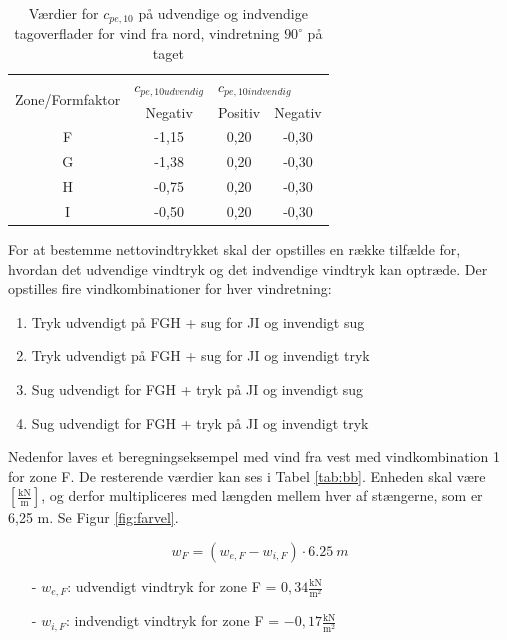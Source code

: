 \begin{table}[htb]
	\begin{center}
		\begin{tabular}{ c c c c } 
			\hline
			\multirow{2}{*}{Zone/Formfaktor} & $c_{pe,10 udvendig}$ & \multicolumn{2}{l}{$c_{pe,10 indvendig}$} \\	
			& Negativ & Positiv & Negativ \\ \hline
			F & -1,15 & 0,20 & -0,30 \\	
			G & -1,38 & 0,20 & -0,30 \\ 
			H & -0,75 & 0,20 & -0,30 \\ 
			I & -0,50 & 0,20 & -0,30 \\	
		\end{tabular}
		\caption{Værdier for $c_{pe,10}$ på udvendige og indvendige tagoverflader for vind fra nord, vindretning $90^{\circ}$ på taget}
		\label{tab:kk}
	\end{center}
\end{table}

For at bestemme nettovindtrykket skal der opstilles en række tilfælde for, hvordan det udvendige vindtryk og det indvendige vindtryk kan optræde.  
\newline
\newline
Der opstilles fire vindkombinationer for hver vindretning:
\begin{enumerate}
	\item Tryk udvendigt på FGH + sug for JI og invendigt sug
	\item Tryk udvendigt på FGH + sug for JI og invendigt tryk
	\item Sug udvendigt for FGH + tryk på JI og invendigt sug
	\item Sug udvendigt for FGH + tryk på JI og invendigt tryk
\end{enumerate}

Nedenfor laves et beregningseksempel med vind fra vest med vindkombination 1 for zone F. De resterende værdier kan ses i Tabel \ref{tab:bb}.
\newline
\newline
Enheden skal være $[\frac{\text{kN}}{\text{m}}]$, og derfor multipliceres med længden mellem hver af stængerne, som er 6,25 m. Se Figur \ref{fig:farvel}.

\begin{equation} 
	w_F = (w_{e,F}-w_{i,F})\cdot \SI{6,25}{m}
\end{equation}

\begin{itemize}
	\item[-] $w_{e,F}$: udvendigt vindtryk for zone F = $0,\!34 \frac{\text{kN}}{\text{m}^2}$
	\item[-] $w_{i,F}$: indvendigt vindtryk for zone F = $-0,\!17 \frac{\text{kN}}{\text{m}^2}$
\end{itemize}

